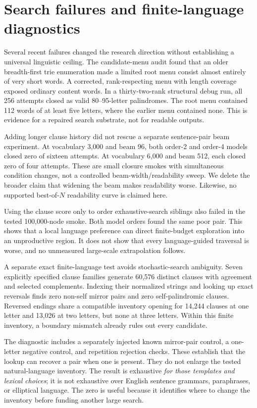 \documentclass[11pt,letterpaper]{article}
\begin{document}
\section{Search failures and finite-language diagnostics}
\label{sec:negative}
Several recent failures changed the research direction without establishing a universal linguistic ceiling. The candidate-menu audit found that an older breadth-first trie enumeration made a limited root menu consist almost entirely of very short words. A corrected, rank-respecting menu with length coverage exposed ordinary content words. In a thirty-two-rank structural debug run, all 256 attempts closed as valid 80--95-letter palindromes. The root menu contained 112 words of at least five letters, where the earlier menu contained none. This is evidence for a repaired search substrate, not for readable outputs.

Adding longer clause history did not rescue a separate sentence-pair beam experiment. At vocabulary 3,000 and beam 96, both order-2 and order-4 models closed zero of sixteen attempts. At vocabulary 6,000 and beam 512, each closed zero of four attempts. These are small closure smokes with simultaneous condition changes, not a controlled beam-width/readability sweep. We delete the broader claim that widening the beam makes readability worse. Likewise, no supported best-of-$N$ readability curve is claimed here.

Using the clause score only to order exhaustive-search siblings also failed in the tested 100,000-node smoke. Both model orders found the same poor pair. This shows that a local language preference can direct finite-budget exploration into an unproductive region. It does not show that every language-guided traversal is worse, and no unmeasured large-scale extrapolation follows.

A separate exact finite-language test avoids stochastic-search ambiguity. Seven explicitly specified clause families generate 60,576 distinct clauses with agreement and selected complements. Indexing their normalized strings and looking up exact reversals finds zero non-self mirror pairs and zero self-palindromic clauses. Reversed endings share a compatible inventory opening for 14,244 clauses at one letter and 13,026 at two letters, but none at three letters. Within this finite inventory, a boundary mismatch already rules out every candidate.

The diagnostic includes a separately injected known mirror-pair control, a one-letter negative control, and repetition rejection checks. These establish that the lookup can recover a pair when one is present. They do not enlarge the tested natural-language inventory. The result is exhaustive \emph{for those templates and lexical choices}; it is not exhaustive over English sentence grammars, paraphrases, or elliptical language. The zero is useful because it identifies where to change the inventory before funding another large search.
\end{document}
